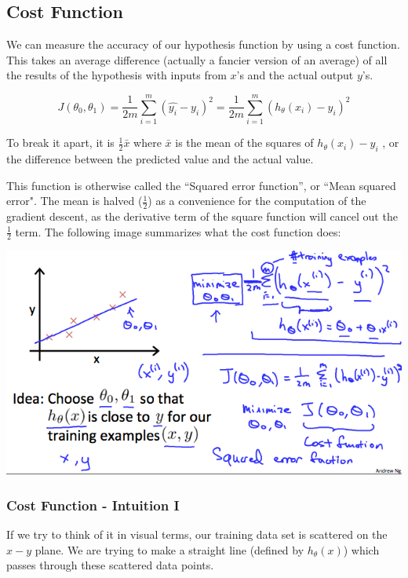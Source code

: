 \documentclass[UTF8]{article}
\begin{document}
\subsection{Cost Function}

We can measure the accuracy of our hypothesis function by using a cost function. This takes an average difference (actually a fancier version of an average) of all the results of the hypothesis with inputs from $x$'s and the actual output $y$'s.

\[ J(\theta_0,\theta_1)=\frac{1}{2m}\sum_{i=1}^{m}(\hat{y_i} - y_i)^2=\frac{1}{2m}\sum_{i=1}^{m}(h_\theta{(x_i)} - {y_i})^2 \]

To break it apart, it is $\frac{1}{2}\bar{x}$ where $\bar{x}$ is the mean of the squares of $h_\theta(x_i) - y_i$ , or the difference between the predicted value and the actual value.

This function is otherwise called the ``Squared error function'', or ``Mean squared error". The mean is halved ($\frac{1}{2}$) as a convenience for the computation of the gradient descent, as the derivative term of the square function will cancel out the $\frac{1}{2}$ term. The following image summarizes what the cost function does:

\includegraphics[width = \textwidth]{NotePics/2_2_1.png}

\subsubsection{Cost Function - Intuition I}

If we try to think of it in visual terms, our training data set is scattered on the $x-y$ plane. We are trying to make a straight line (defined by $h_\theta(x)$) which passes through these scattered data points.
\end{document}
